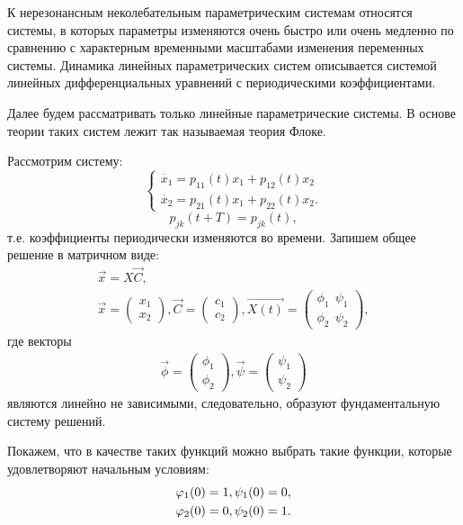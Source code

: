 К нерезонансным неколебательным параметрическим системам относятся системы, в которых параметры изменяются очень быстро или очень медленно по сравнению с характерным временными масштабами изменения переменных системы. Динамика линейных параметрических систем описывается системой линейных дифференциальных уравнений с периодическими коэффициентами. 

Далее будем рассматривать только линейные параметрические системы. В основе теории таких систем лежит так называемая теория Флоке. 

Рассмотрим систему:
\begin{equation}
	\begin{cases}
		\dot{x_1}=p_{11}(t)x_1+p_{12}(t)x_2 \\
		\dot{x_2}=p_{21}(t)x_1+p_{22}(t)x_2.		
	\end{cases}
	\label{eq:47}
\end{equation}
\begin{equation*}
	p_{jk}(t+T)=p_{jk}(t),
\end{equation*}
т.е. коэффициенты периодически изменяются во времени. Запишем общее решение в матричном виде:
\begin{gather*}
	\vec{x} = X \vec{C}, \\
	\vec{x}= 
	\begin{pmatrix}
		x_1 \\
		x_2
	\end{pmatrix}
	,
	\vec{C}= 
	\begin{pmatrix}
		c_1 \\
		c_2
	\end{pmatrix}
	,
	\vec{X(t)}= 
	\begin{pmatrix}
		\phi_1 ~~  \psi_1 \\
		\phi_2  ~~ \psi_2
	\end{pmatrix}
	,
\end{gather*}
где векторы 
\begin{gather*}
	\vec{\phi}= 
	\begin{pmatrix}
		\phi_1 \\
		\phi_2
	\end{pmatrix}
	,
	\vec{\psi}= 
	\begin{pmatrix}
		\psi_1 \\
		\psi_2
	\end{pmatrix}
\end{gather*}
являются линейно не зависимыми, следовательно, образуют фундаментальную систему решений. 

Покажем, что в качестве таких функций можно выбрать такие функции, которые удовлетворяют начальным условиям:
\begin{gather}
	\phi_1(0)=1, \psi_1(0)=0, \notag \\ 
	\phi_2(0)=0, \psi_2(0)=1.		
	\label{eq:48}
\end{gather}

